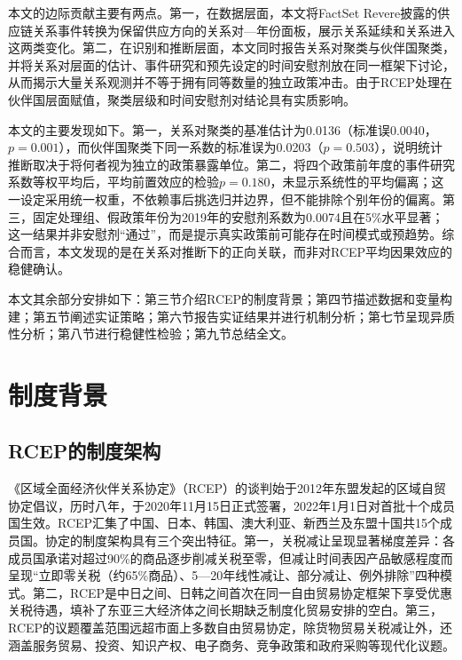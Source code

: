 \documentclass[12pt,a4paper]{ctexart}
\begin{document}
本文的边际贡献主要有两点。第一，在数据层面，本文将FactSet Revere披露的供应链关系事件转换为保留供应方向的关系对—年份面板，展示关系延续和关系进入这两类变化。第二，在识别和推断层面，本文同时报告关系对聚类与伙伴国聚类，并将关系对层面的估计、事件研究和预先设定的时间安慰剂放在同一框架下讨论，从而揭示大量关系观测并不等于拥有同等数量的独立政策冲击。由于RCEP处理在伙伴国层面赋值，聚类层级和时间安慰剂对结论具有实质影响。

本文的主要发现如下。第一，关系对聚类的基准估计为0.0136（标准误0.0040，$p=0.001$），而伙伴国聚类下同一系数的标准误为0.0203（$p=0.503$），说明统计推断取决于将何者视为独立的政策暴露单位。第二，将四个政策前年度的事件研究系数等权平均后，平均前置效应的检验$p=0.180$，未显示系统性的平均偏离；这一设定采用统一权重，不依赖事后挑选归并边界，但不能排除个别年份的偏离。第三，固定处理组、假政策年份为2019年的安慰剂系数为0.0074且在5\%水平显著；这一结果并非安慰剂“通过”，而是提示真实政策前可能存在时间模式或预趋势。综合而言，本文发现的是在关系对推断下的正向关联，而非对RCEP平均因果效应的稳健确认。

本文其余部分安排如下：第三节介绍RCEP的制度背景；第四节描述数据和变量构建；第五节阐述实证策略；第六节报告实证结果并进行机制分析；第七节呈现异质性分析；第八节进行稳健性检验；第九节总结全文。


\section{制度背景}

\subsection{RCEP的制度架构}

《区域全面经济伙伴关系协定》（RCEP）的谈判始于2012年东盟发起的区域自贸协定倡议，历时八年，于2020年11月15日正式签署，2022年1月1日对首批十个成员国生效。RCEP汇集了中国、日本、韩国、澳大利亚、新西兰及东盟十国共15个成员国。协定的制度架构具有三个突出特征。第一，关税减让呈现显著梯度差异：各成员国承诺对超过90\%的商品逐步削减关税至零，但减让时间表因产品敏感程度而呈现``立即零关税（约65\%商品）、5—20年线性减让、部分减让、例外排除''四种模式\citep{liu2022rcep}。第二，RCEP是中日之间、日韩之间首次在同一自由贸易协定框架下享受优惠关税待遇，填补了东亚三大经济体之间长期缺乏制度化贸易安排的空白\citep{ping2021rcep}。第三，RCEP的议题覆盖范围远超市面上多数自由贸易协定，除货物贸易关税减让外，还涵盖服务贸易、投资、知识产权、电子商务、竞争政策和政府采购等现代化议题\citep{shen2020rcep}。
\end{document}
